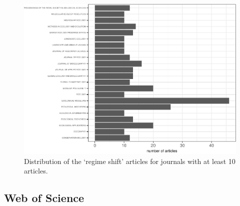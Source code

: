 \documentclass[12pt,twoside,openany]{reedthesis}
\begin{document}
\begin{figure}
\centering
\includegraphics{_myDissertation_files/figure-latex/wosRegimePubsByJrnlmin10Pubs-1.pdf}
\caption{\label{fig:wosRegimePubsByJrnlmin10Pubs}Distribution of the `regime shift' articles for journals with at least 10 articles.}
\end{figure}
\hypertarget{web-of-science-1}{%
\subsection{Web of Science}\label{web-of-science-1}}
\end{document}
